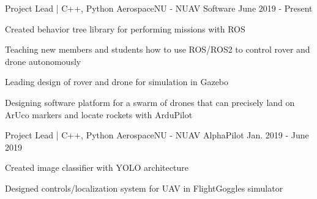 
\begin{cventries}
  \cventry
    {Project Lead | C++, Python} %
    {AerospaceNU - NUAV Software} %
    {} %
    {June 2019 - Present} %
    {
      \begin{cvitems} %
        \item {Created behavior tree library for performing missions with ROS}
        \item {Teaching new members and students how to use ROS/ROS2 to control rover and drone autonomously}
        \item {Leading design of rover and drone for simulation in Gazebo}
        \item {Designing software platform for a swarm of drones that can precisely land on ArUco markers and locate rockets with ArduPilot}
      \end{cvitems}
    }
  \cventry
    {Project Lead | C++, Python} %
    {AerospaceNU - NUAV AlphaPilot} %
    {} %
    {Jan. 2019 - June 2019} %
    {
      \begin{cvitems} %
        \item {Created image classifier with YOLO architecture}
        \item {Designed controls/localization system for UAV in FlightGoggles simulator}
      \end{cvitems}
    }
\end{cventries}
